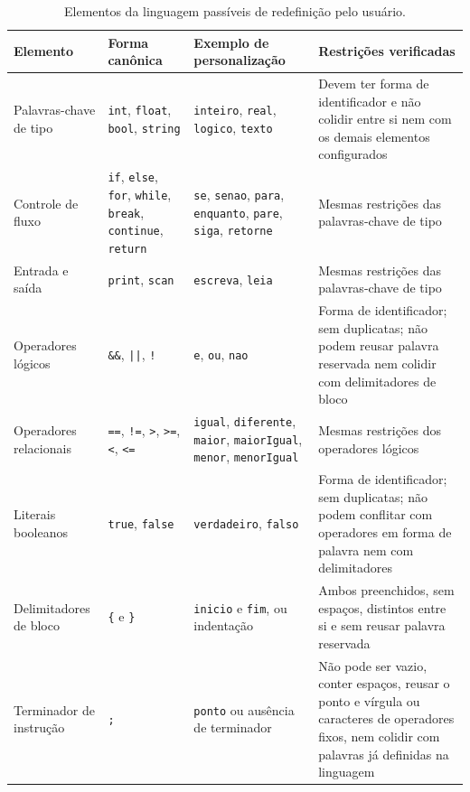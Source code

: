 \begin{table}[htbp]
    \centering
    \caption{Elementos da linguagem passíveis de redefinição pelo usuário.}
    \label{tab:elementos-configuraveis}
    \footnotesize
    \setlength{\tabcolsep}{4pt}
    \renewcommand{\arraystretch}{1.25}
    \begin{tabular}{|>{\raggedright\arraybackslash}p{2.5cm}|>{\raggedright\arraybackslash}p{2.6cm}|>{\raggedright\arraybackslash}p{2.9cm}|>{\raggedright\arraybackslash}p{5.2cm}|}
        \hline
        \textbf{Elemento} & \textbf{Forma canônica} & \textbf{Exemplo de personalização} & \textbf{Restrições verificadas} \\
        \hline
        Palavras-chave de tipo & \texttt{int}, \texttt{float}, \texttt{bool}, \texttt{string} & \texttt{inteiro}, \texttt{real}, \texttt{logico}, \texttt{texto} & Devem ter forma de identificador e não colidir entre si nem com os demais elementos configurados \\
        \hline
        Controle de fluxo & \texttt{if}, \texttt{else}, \texttt{for}, \texttt{while}, \texttt{break}, \texttt{continue}, \texttt{return} & \texttt{se}, \texttt{senao}, \texttt{para}, \texttt{enquanto}, \texttt{pare}, \texttt{siga}, \texttt{retorne} & Mesmas restrições das palavras-chave de tipo \\
        \hline
        Entrada e saída & \texttt{print}, \texttt{scan} & \texttt{escreva}, \texttt{leia} & Mesmas restrições das palavras-chave de tipo \\
        \hline
        Operadores lógicos & \texttt{\&\&}, \texttt{||}, \texttt{!} & \texttt{e}, \texttt{ou}, \texttt{nao} & Forma de identificador; sem duplicatas; não podem reusar palavra reservada nem colidir com delimitadores de bloco \\
        \hline
        Operadores relacionais & \texttt{==}, \texttt{!=}, \texttt{>}, \texttt{>=}, \texttt{<}, \texttt{<=} & \texttt{igual}, \texttt{diferente}, \texttt{maior}, \texttt{maiorIgual}, \texttt{menor}, \texttt{menorIgual} & Mesmas restrições dos operadores lógicos \\
        \hline
        Literais booleanos & \texttt{true}, \texttt{false} & \texttt{verdadeiro}, \texttt{falso} & Forma de identificador; sem duplicatas; não podem conflitar com operadores em forma de palavra nem com delimitadores \\
        \hline
        Delimitadores de bloco & \texttt{\{} e \texttt{\}} & \texttt{inicio} e \texttt{fim}, ou indentação & Ambos preenchidos, sem espaços, distintos entre si e sem reusar palavra reservada \\
        \hline
        Terminador de instrução & \texttt{;} & \texttt{ponto} ou ausência de terminador & Não pode ser vazio, conter espaços, reusar o ponto e vírgula ou caracteres de operadores fixos, nem colidir com palavras já definidas na linguagem \\
        \hline
    \end{tabular}
\end{table}


